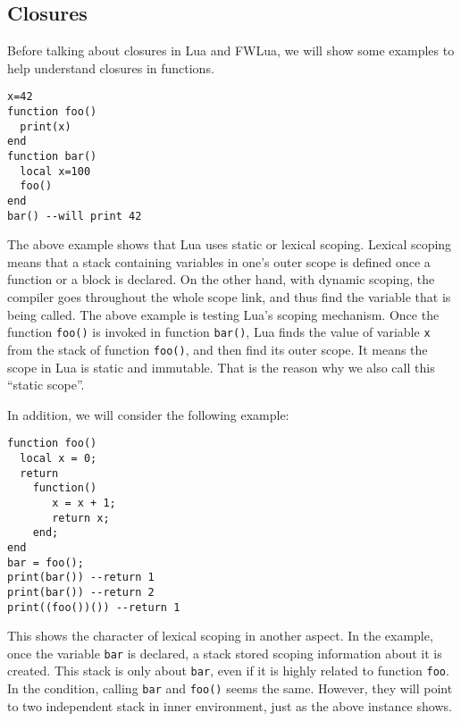 \subsection{Closures}
Before talking about closures in Lua and FWLua, we will show some examples to help understand closures in functions.
\begin{verbatim}
x=42
function foo()
  print(x)
end
function bar()
  local x=100
  foo()
end
bar() --will print 42
\end{verbatim}
The above example shows that Lua uses static or lexical scoping.
Lexical scoping means that a stack containing variables in one's outer scope is defined once a function or a block is declared.
On the other hand,
with dynamic scoping, the compiler goes throughout the whole scope link, and thus find the variable that is being called.
The above example is testing Lua's scoping mechanism.
Once the function {\tt foo()} is invoked in function {\tt bar()}, Lua finds the value of variable {\tt x} from the stack of function {\tt foo()}, and then find its outer scope.
It means the scope in Lua is static and immutable. That is the reason why we also call this ``static scope''.





In addition, we will consider the following example:
\begin{verbatim}
function foo()
  local x = 0;
  return 
    function() 
       x = x + 1;
       return x; 
    end;
end
bar = foo();
print(bar()) --return 1
print(bar()) --return 2
print((foo())()) --return 1
\end{verbatim}

This shows the character of lexical scoping in another aspect.
In the example, once the variable {\tt bar} is declared, a stack stored scoping information about it is created.
This stack is only about {\tt bar}, even if it is highly related to function {\tt foo}.
In the condition, calling {\tt bar} and {\tt foo()} seems the same. However, they will point to two independent stack in inner environment, just as the above instance shows.


